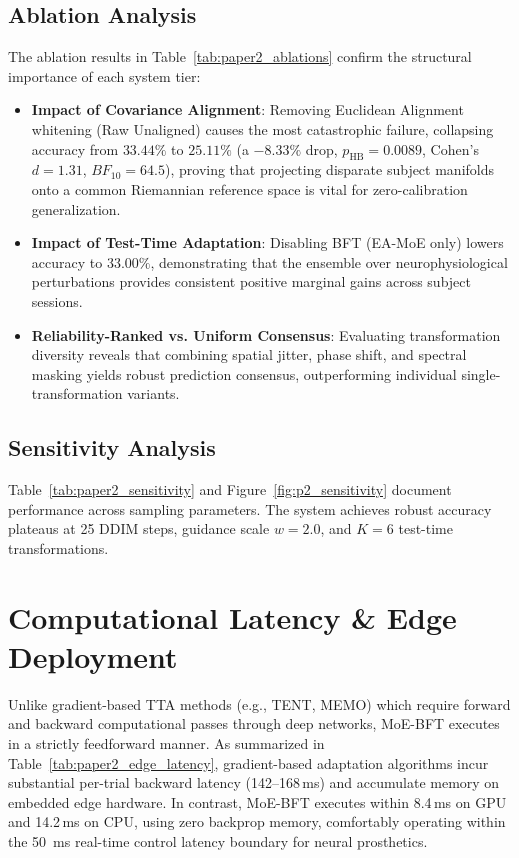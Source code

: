 \documentclass[journal,10pt]{IEEEtran}
\begin{document}
\subsection{Ablation Analysis}


The ablation results in Table~\ref{tab:paper2_ablations} confirm the structural importance of each system tier:
\begin{itemize}
    \item \textbf{Impact of Covariance Alignment}: Removing Euclidean Alignment whitening (Raw Unaligned) causes the most catastrophic failure, collapsing accuracy from $33.44\%$ to $25.11\%$ (a $-8.33\%$ drop, $p_{\text{HB}} = 0.0089$, Cohen's $d = 1.31$, $BF_{10} = 64.5$), proving that projecting disparate subject manifolds onto a common Riemannian reference space is vital for zero-calibration generalization.
    \item \textbf{Impact of Test-Time Adaptation}: Disabling BFT (EA-MoE only) lowers accuracy to $33.00\%$, demonstrating that the ensemble over neurophysiological perturbations provides consistent positive marginal gains across subject sessions.
    \item \textbf{Reliability-Ranked vs. Uniform Consensus}: Evaluating transformation diversity reveals that combining spatial jitter, phase shift, and spectral masking yields robust prediction consensus, outperforming individual single-transformation variants.
\end{itemize}

\subsection{Sensitivity Analysis}


Table~\ref{tab:paper2_sensitivity} and Figure~\ref{fig:p2_sensitivity} document performance across sampling parameters. The system achieves robust accuracy plateaus at 25 DDIM steps, guidance scale $w=2.0$, and $K=6$ test-time transformations.

\section{Computational Latency \& Edge Deployment}


Unlike gradient-based TTA methods (e.g., TENT, MEMO) which require forward and backward computational passes through deep networks, MoE-BFT executes in a strictly feedforward manner. As summarized in Table~\ref{tab:paper2_edge_latency}, gradient-based adaptation algorithms incur substantial per-trial backward latency (142--168\,ms) and accumulate memory on embedded edge hardware. In contrast, MoE-BFT executes within 8.4\,ms on GPU and 14.2\,ms on CPU, using zero backprop memory, comfortably operating within the 50~ms real-time control latency boundary for neural prosthetics.
\end{document}
